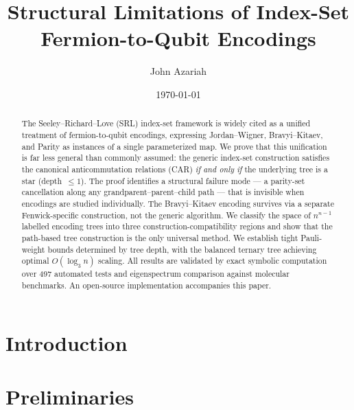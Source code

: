 \documentclass[aps,pra,preprint,superscriptaddress,showpacs]{revtex4-2}
\theoremstyle{definition}
\theoremstyle{remark}
\begin{document}
\title{Structural Limitations of Index-Set Fermion-to-Qubit Encodings}

\author{John Azariah}

\date{\today}

\begin{abstract}
The Seeley--Richard--Love (SRL) index-set framework is widely cited as
a unified treatment of fermion-to-qubit encodings, expressing
Jordan--Wigner, Bravyi--Kitaev, and Parity as instances of a single
parameterized map.  We prove that this unification is far less general
than commonly assumed: the generic index-set construction satisfies the
canonical anticommutation relations (CAR) \emph{if and only if} the
underlying tree is a star (depth~$\le 1$).  The proof identifies a
structural failure mode --- a parity-set cancellation along any
grandparent--parent--child path --- that is invisible when encodings
are studied individually.  The Bravyi--Kitaev encoding survives via a
separate Fenwick-specific construction, not the generic algorithm.  We
classify the space of $n^{n-1}$ labelled encoding trees into three
construction-compatibility regions and show that the path-based tree
construction is the only universal method.  We establish tight
Pauli-weight bounds determined by tree depth, with the balanced ternary
tree achieving optimal $O(\log_3 n)$ scaling.  All results are
validated by exact symbolic computation over 497 automated tests and
eigenspectrum comparison against molecular benchmarks.  An open-source
implementation accompanies this paper.
\end{abstract}

\maketitle

\section{Introduction}
\label{sec:intro}


\section{Preliminaries}
\label{sec:prelim}

\end{document}
